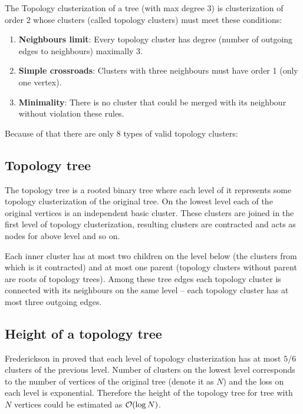The {\I Topology clusterization} of a tree (with max degree 3) is clusterization
of order 2 whose clusters (called {\I topology clusters}) must meet these conditions:
\begin{enumerate}
\item {\bf Neighbours limit}: Every topology cluster has degree (number of
outgoing edges to neighbours) maximally 3.
\item {\bf Simple crossroads}: Clusters with three neighbours must have order 1 (only one vertex).
\item {\bf Minimality}: There is no cluster that could be merged with its neighbour
without violation these rules.
\end{enumerate}

Because of that there are only 8 types of valid topology clusters:


\subsection{Topology tree}

The {\I topology tree} is a rooted binary tree where each
level of it represents some topology clusterization of the original tree. On the
lowest level each of the original vertices is an independent basic cluster.
These clusters are joined in the first level of topology clusterization,
resulting clusters are contracted and acts as nodes for above level and so on.

Each inner cluster has at most two children on the level below (the clusters
from which is it contracted) and at most one parent (topology clusters without
parent are roots of topology trees). Among these tree edges each topology
cluster is connected with its neighbours on the same level -- each topology
cluster has at most three outgoing edges.

\subsection{Height of a topology tree}

Frederickson in \cite{DSforDynamicallyMaintainingRootedTrees} proved that each
level of topology clusterization has at most $5/6$ clusters of the previous
level. Number of clusters on the lowest level corresponds to the number of
vertices of the original tree (denote it as $N$) and the loss on each level is
exponential. Therefore the height of the topology tree for tree with $N$
vertices could be estimated as ${\cal O}(\log N)$.

